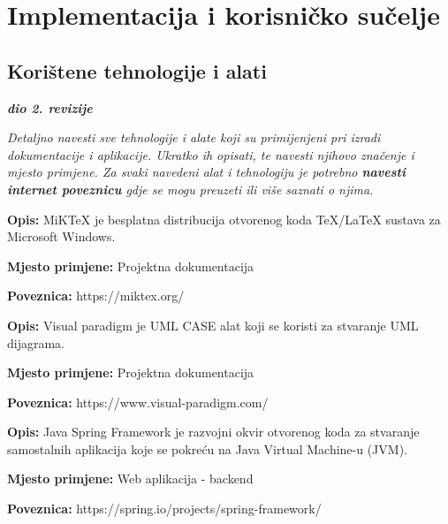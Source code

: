 \chapter{Implementacija i korisničko sučelje}
		
		
		\section{Korištene tehnologije i alati}
		
			\textbf{\textit{dio 2. revizije}}
			
			 \textit{Detaljno navesti sve tehnologije i alate koji su primijenjeni pri izradi dokumentacije i aplikacije. Ukratko ih opisati, te navesti njihovo značenje i mjesto primjene. Za svaki navedeni alat i tehnologiju je potrebno \textbf{navesti internet poveznicu} gdje se mogu preuzeti ili više saznati o njima}.
			 
			 \noindent {}
			 \begin{packed_item}
			 	\item  \textbf{Opis:} MiKTeX je besplatna distribucija otvorenog koda TeX/LaTeX sustava za Microsoft Windows.
			 	\item  \textbf{Mjesto primjene:} Projektna dokumentacija
			 	\item  \textbf{Poveznica:} https://miktex.org/
			 \end{packed_item}
		
			\noindent {}
			\begin{packed_item}
				\item  \textbf{Opis:} Visual paradigm je UML CASE alat koji se koristi za stvaranje UML dijagrama.
				\item  \textbf{Mjesto primjene:} Projektna dokumentacija
				\item  \textbf{Poveznica:} https://www.visual-paradigm.com/
			\end{packed_item}
		
			\noindent {}
			\begin{packed_item}
				\item  \textbf{Opis:} Java Spring Framework je razvojni okvir otvorenog koda za stvaranje samostalnih aplikacija koje se pokreću na Java Virtual Machine-u (JVM).
				\item  \textbf{Mjesto primjene:} Web aplikacija - backend
				\item  \textbf{Poveznica:} https://spring.io/projects/spring-framework/
			\end{packed_item}
		

